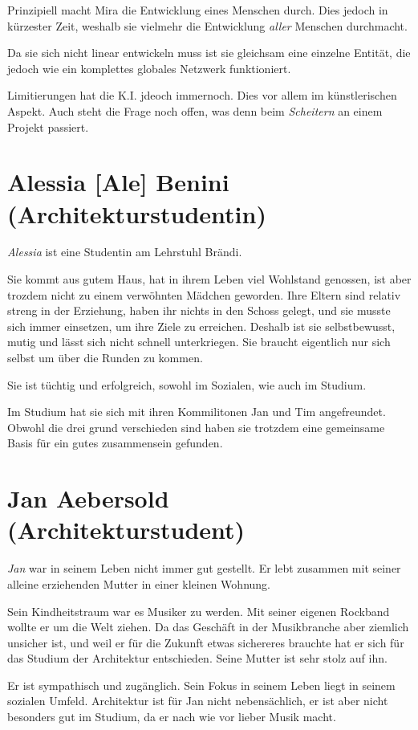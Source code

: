 \documentclass[11pt,a4paper,ngerman]{scrreprt}
\begin{document}
Prinzipiell macht Mira die Entwicklung eines Menschen durch. Dies jedoch in
kürzester Zeit, weshalb sie vielmehr die Entwicklung \emph{aller} Menschen
durchmacht.

Da sie sich nicht linear entwickeln muss ist sie gleichsam eine einzelne
Entität, die jedoch wie ein komplettes globales Netzwerk funktioniert.

Limitierungen hat die K.I. jdeoch immernoch. Dies vor allem im künstlerischen
Aspekt. Auch steht die Frage noch offen, was denn beim \emph{Scheitern} an einem
Projekt passiert.

\section*{Alessia [Ale] Benini (Architekturstudentin)}

\emph{Alessia} ist eine Studentin am Lehrstuhl Brändi.

Sie kommt aus gutem Haus, hat in ihrem Leben viel Wohlstand genossen, ist aber
trozdem nicht zu einem verwöhnten Mädchen geworden. Ihre Eltern sind relativ
streng in der Erziehung, haben ihr nichts in den Schoss gelegt, und sie musste
sich immer einsetzen, um ihre Ziele zu erreichen. Deshalb ist sie selbstbewusst,
mutig und lässt sich nicht schnell unterkriegen. Sie braucht eigentlich nur sich
selbst um über die Runden zu kommen.

Sie ist tüchtig und erfolgreich, sowohl im Sozialen, wie auch im Studium.

Im Studium hat sie sich mit ihren Kommilitonen Jan und Tim angefreundet. Obwohl
die drei grund verschieden sind haben sie trotzdem eine gemeinsame Basis für ein
gutes zusammensein gefunden.


\section*{Jan Aebersold (Architekturstudent)}

\emph{Jan} war in seinem Leben nicht immer gut gestellt. Er lebt zusammen mit seiner
alleine erziehenden Mutter in einer kleinen Wohnung.

Sein Kindheitstraum war es Musiker zu werden. Mit seiner eigenen Rockband wollte
er um die Welt ziehen. Da das Geschäft in der Musikbranche aber ziemlich
unsicher ist, und weil er für die Zukunft etwas sichereres brauchte hat er sich
für das Studium der Architektur entschieden. Seine Mutter ist sehr stolz auf
ihn.

Er ist sympathisch und zugänglich. Sein Fokus in seinem Leben liegt in seinem
sozialen Umfeld. Architektur ist für Jan nicht nebensächlich, er ist aber nicht
besonders gut im Studium, da er nach wie vor lieber Musik macht.
\end{document}
